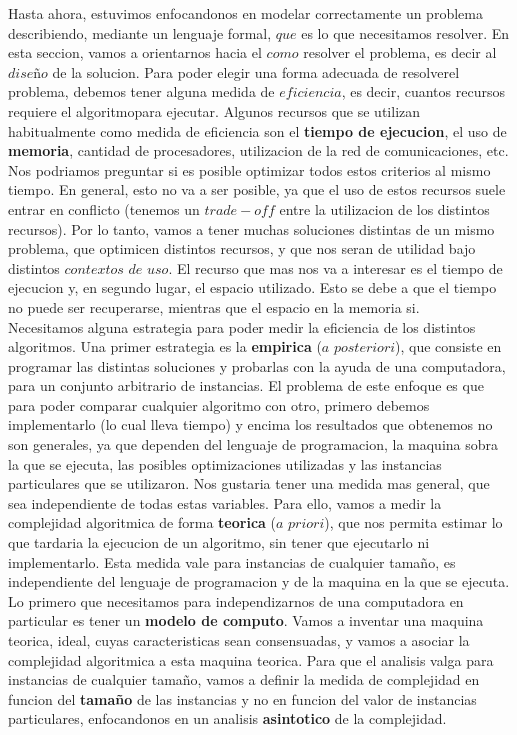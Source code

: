 \documentclass[10pt,a4paper]{article}
\begin{document}
Hasta ahora, estuvimos enfocandonos en modelar correctamente un problema describiendo, mediante un lenguaje formal, $que$ es lo que necesitamos resolver. En esta seccion, vamos a orientarnos hacia el $como$ resolver el problema, es decir al $dise$ñ$o$ de la solucion. Para poder elegir una forma adecuada de resolverel problema, debemos tener alguna medida de $eficiencia$, es decir, cuantos recursos requiere el algoritmopara ejecutar. Algunos recursos que se utilizan habitualmente como medida de eficiencia son el \textbf{tiempo de ejecucion}, el uso de \textbf{memoria}, cantidad de procesadores, utilizacion de la red de comunicaciones, etc. Nos podriamos preguntar si es posible optimizar todos estos criterios al mismo tiempo. En general, esto no va a ser posible, ya que el uso de estos recursos suele entrar en conflicto (tenemos un $trade-off$ entre la utilizacion de los distintos recursos). Por lo tanto, vamos a tener muchas soluciones distintas de un mismo problema, que optimicen distintos recursos, y que nos seran de utilidad bajo distintos $contextos$ $de$ $uso$. El recurso que mas nos va a interesar es el tiempo de ejecucion y, en segundo lugar, el espacio utilizado. Esto se debe a que el tiempo no puede ser recuperarse, mientras que el espacio en la memoria si.  
\newline
\newline
Necesitamos alguna estrategia para poder medir la eficiencia de los distintos algoritmos. Una primer estrategia es la \textbf{empirica} ($a$ $posteriori$), que consiste en programar las distintas soluciones y probarlas con la ayuda de una computadora, para un conjunto arbitrario de instancias. El problema de este enfoque es que para poder comparar cualquier algoritmo con otro, primero debemos implementarlo (lo cual lleva tiempo) y encima los resultados que obtenemos no son generales, ya que dependen del lenguaje de programacion, la maquina sobra la que se ejecuta, las posibles optimizaciones utilizadas y las instancias
particulares que se utilizaron. Nos gustaria tener una medida mas general, que sea independiente de todas estas variables.
\newline
\newline
Para ello, vamos a medir la complejidad algoritmica de forma \textbf{teorica} ($a$ $priori$), que nos permita estimar lo que tardaria la ejecucion de un algoritmo, sin tener que ejecutarlo ni implementarlo. Esta medida vale para instancias de cualquier tamaño, es independiente del lenguaje de programacion y de la maquina en la que se ejecuta. Lo primero que necesitamos para independizarnos de una computadora en particular es tener un \textbf{modelo de computo}. Vamos a inventar una maquina teorica, ideal, cuyas
caracteristicas sean consensuadas, y vamos a asociar la complejidad algoritmica a esta maquina teorica.
\newline
Para que el analisis valga para instancias de cualquier tamaño, vamos a definir la medida de complejidad en funcion del \textbf{tamaño} de las instancias y no en funcion del valor de instancias particulares, enfocandonos en un analisis \textbf{asintotico} de la complejidad.
\end{document}
